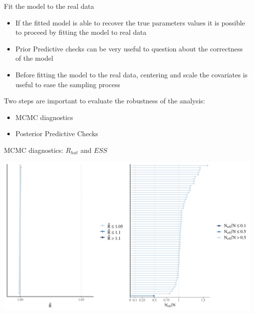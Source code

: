 \documentclass[ignorenonframetext,a4paper]{beamer}
\begin{document}
\begin{frame}{Fit the model to the real data}

\begin{itemize}
\setlength\itemsep{1em}
  \item{If the fitted model is able to recover the true parameters
        values it is possible to proceed by fitting the model to
        real data}
  \item{Prior Predictive checks can be very useful to question about
        the correctness of the model}
  \item{Before fitting the model to the real data, centering and scale
        the covariates is useful to ease the sampling process}
\end{itemize}

Two steps are important to evaluate the robustness of the analysis:

\begin{itemize}
  \item{MCMC diagnostics}
  \item{Posterior Predictive Checks}
\end{itemize}

\end{frame}

\begin{frame}{MCMC diagnostics: \(R_{hat}\) and \(ESS\)}

\includegraphics{DB_presentation_case_study_files/figure-beamer/unnamed-chunk-10-1.pdf}

\end{frame}
\end{document}
